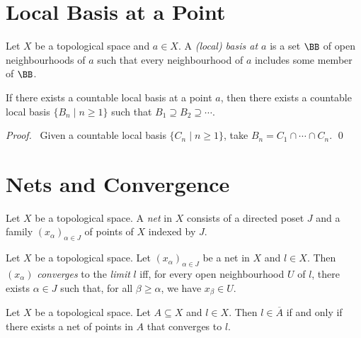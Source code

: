 \section{Local Basis at a Point}

\begin{definition}
    Let $X$ be a topological space and $a \in X$. A \emph{(local) basis at $a$} is a set $\BB$ of open neighbourhoods of $a$ such that every neighbourhood of $a$ includes some
    member of $\BB$.
\end{definition}

\begin{lemma}
    \label{lemma:countable_local_basis}
    If there exists a countable local basis at a point $a$, then there exists a countable local basis $\{ B_n \mid n \geq 1 \}$ such that $B_1 \supseteq B_2 \supseteq \cdots$. 
\end{lemma}

\begin{proof}
    \pf\ Given a countable local basis $\{ C_n \mid n \geq 1 \}$, take $B_n = C_1 \cap \cdots \cap C_n$. \qed
\end{proof}

\section{Nets and Convergence}

\begin{definition}[Net]
    Let $X$ be a topological space. A \emph{net} in $X$ consists of a directed poset $J$
    and a family $(x_\alpha)_{\alpha \in J}$ of points of $X$ indexed by $J$.
\end{definition}

\begin{definition}[Convergence]
    Let $X$ be a topological space. Let $(x_\alpha)_{\alpha \in J}$ be a net in $X$
    and $l \in X$. Then $(x_\alpha)$ \emph{converges} to the \emph{limit} $l$
    iff, for every open neighbourhood $U$ of $l$, there exists $\alpha \in J$ such that,
    for all $\beta \geq \alpha$, we have $x_\beta \in U$.
\end{definition}

\begin{lemma}[Choice]
    \label{lemma:closure_net}
    Let $X$ be a topological space. Let $A \subseteq X$ and $l \in X$. 
    Then $l \in \overline{A}$ if and only if there exists a net of points in $A$
    that converges to $l$.
\end{lemma}

